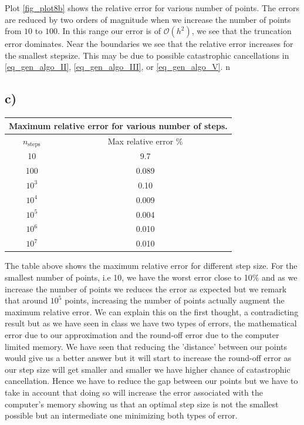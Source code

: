 \documentclass[a4paper,10pt,english]{article}
\begin{document}
Plot \ref{fig_plot8b} shows the relative error for various number of points. The errors are reduced by two
orders of magnitude when we increase the number of points from $10$ to $100$. In this range our error
is of $\mathcal{O}(h^2)$, we see that the truncation error dominates. Near the boundaries we see that the
relative error increases for the smallest stepsize. This may be due to possible catastrophic cancellations
in \ref{eq_gen_algo_II},  \ref{eq_gen_algo_III}, or  \ref{eq_gen_algo_V}.
n
\subsection{c)}
 \begin{tabular}{ |c||c|}
 	\hline
 	\multicolumn{2}{|c|}{Maximum relative error for various number of steps.} \\
 	\hline
 	$n_{\text{steps}}$ & Max relative error \% \\
 	\hline
   10 & 9.7 \\
   100 & 0.089 \\
   $10^3$ & 0.10 \\
   $10^4$ & 0.009 \\
   $10^5$ & 0.004 \\
   $10^6$ & 0.010 \\
   $10^7$ & 0.010 \\
   \hline
\end{tabular}


The table above shows the maximum relative error for different step size. For the smallest number of points, i.e 10, we have the worst error close to 10$\%$ and as we increase the number of points we reduces the error as expected but we remark that around $10^5$ points, increasing the number of points actually augment the maximum relative error. We can explain this on the first thought, a contradicting result but as we have seen in class we have two types of errors, the mathematical error due to our approximation and the round-off error due to the computer limited memory. We have seen that reducing the 'distance' between our points would give us a better answer but it will start to increase the round-off error as our step size will get smaller and smaller we have higher chance of catastrophic cancellation. Hence we have to reduce the gap between our points but we have to take in account that doing so will increase the error associated with the computer's memory showing us that an optimal step size is not the smallest possible but an intermediate one minimizing both types of error.  
\end{document}
